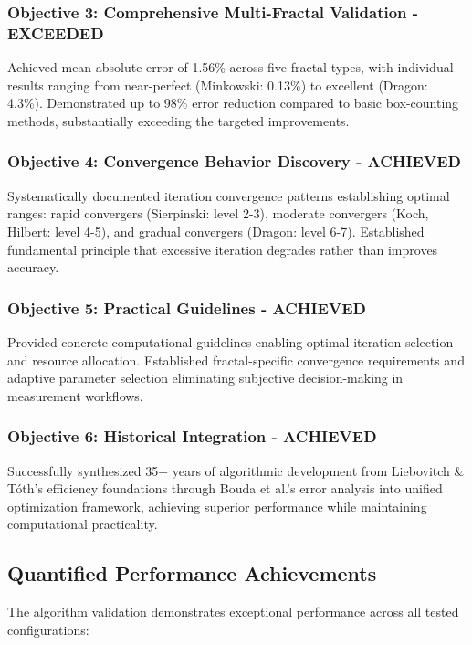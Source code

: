\documentclass[preprint,12pt]{elsarticle}
\def\textbf#1{#1}%
\begin{document}
\subsubsection{Objective 3: Comprehensive Multi-Fractal Validation - EXCEEDED}
Achieved \textbf{mean absolute error of 1.56\%} across five fractal types, with individual results ranging from near-perfect (Minkowski: 0.13\%) to excellent (Dragon: 4.3\%). Demonstrated \textbf{up to 98\% error reduction} compared to basic box-counting methods, substantially exceeding the targeted improvements.

\subsubsection{Objective 4: Convergence Behavior Discovery - ACHIEVED}
Systematically documented iteration convergence patterns establishing optimal ranges: rapid convergers (Sierpinski: level 2-3), moderate convergers (Koch, Hilbert: level 4-5), and gradual convergers (Dragon: level 6-7). Established fundamental principle that excessive iteration degrades rather than improves accuracy.

\subsubsection{Objective 5: Practical Guidelines - ACHIEVED}
Provided concrete computational guidelines enabling optimal iteration selection and resource allocation. Established fractal-specific convergence requirements and adaptive parameter selection eliminating subjective decision-making in measurement workflows.

\subsubsection{Objective 6: Historical Integration - ACHIEVED}
Successfully synthesized 35+ years of algorithmic development from Liebovitch \& Tóth's efficiency foundations through Bouda et al.'s error analysis into unified optimization framework, achieving superior performance while maintaining computational practicality.

\subsection{Quantified Performance Achievements}

The algorithm validation demonstrates exceptional performance across all tested configurations:
\end{document}
